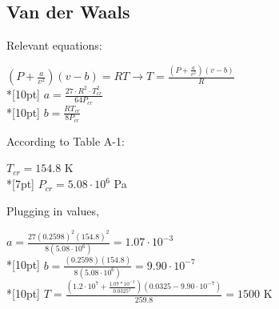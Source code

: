 \documentclass{article}
\begin{document}
\subsection{Van der Waals}
Relevant equations:
\begin{center}
\(\displaystyle (P + \frac{a}{v^2})(v-b) = RT\rightarrow T=\frac{(P + \frac{a}{v^2})(v-b)}{R}\)\\*[10pt]
\(\displaystyle a=\frac{27\cdot R^2\cdot T_{cr}^2}{64P_{cr}}\)\\*[10pt]
\(\displaystyle b=\frac{RT_{cr}}{8P_{cr}}\)
\end{center}
According to Table A-1:
\begin{center}
\(T_{cr}=154.8 \) K\\*[7pt]
\(P_{cr}=5.08\cdot 10^6\) Pa
\end{center}
Plugging in values,
\begin{center}
\(\displaystyle a = \frac{27(0.2598)^2(154.8)^2}{8(5.08\cdot 10^6)}=1.07\cdot 10^{-3}\)\\*[10pt]
\(\displaystyle b = \frac{(0.2598)(154.8)}{8(5.08\cdot 10^6)}=9.90\cdot 10^{-7}\)\\*[10pt]
\(\displaystyle T=\frac{(1.2\cdot10^7 + \frac{1.07*10^{-3}}{0.0325^2})(0.0325-9.90\cdot 10^{-7})}{259.8}=1500\) K
\end{center}
\clearpage \noindent
\end{document}
